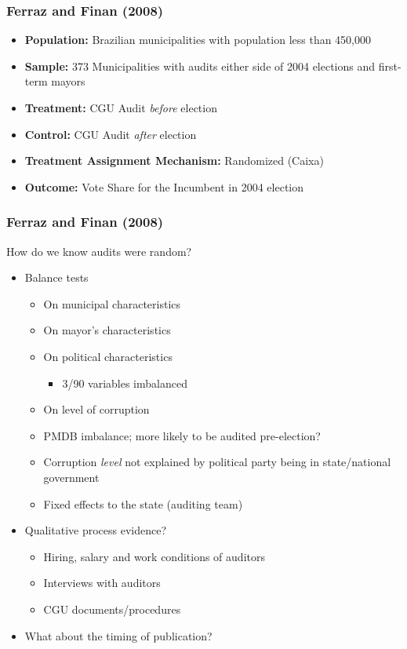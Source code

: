 \documentclass[xcolor=x11names,compress]{beamer}\usepackage[]{graphicx}\usepackage[]{color}
\renewcommand{\(}{\begin{columns}}
\renewcommand{\)}{\end{columns}}
\newcommand{\<}[1]{\begin{column}{#1}}
\renewcommand{\>}{\end{column}}
\begin{document}
\begin{frame}
\frametitle{Ferraz and Finan (2008)}
\begin{itemize}
\item \textbf{Population:} Brazilian municipalities with population less than 450,000
\pause
\item \textbf{Sample:} 373 Municipalities with audits either side of 2004 elections and first-term mayors
\pause
\item \textbf{Treatment:} CGU Audit \textit{before} election
\pause
\item \textbf{Control:} CGU Audit \textit{after} election
\pause
\item \textbf{Treatment Assignment Mechanism:} Randomized (Caixa)
\pause
\item \textbf{Outcome:} Vote Share for the Incumbent in 2004 election
\end{itemize}
\end{frame}

\begin{frame}
\frametitle{Ferraz and Finan (2008)}
How do we know audits were random?
\pause
\begin{itemize}
\item Balance tests
\begin{itemize}
\item On municipal characteristics
\item On mayor's characteristics
\item On political characteristics
\begin{itemize}
\item 3/90 variables imbalanced
\end{itemize}
\item On level of corruption
\pause
\item PMDB imbalance; more likely to be audited pre-election?
\pause
\item Corruption \textit{level} not explained by political party being in state/national government
\pause
\item Fixed effects to the state (auditing team)
\end{itemize}
\pause
\item Qualitative process evidence?
\pause
\begin{itemize}
\item Hiring, salary and work conditions of auditors
\pause
\item Interviews with auditors
\pause
\item CGU documents/procedures
\pause
\end{itemize}
\item What about the timing of publication?
\end{itemize}
\end{frame}
\end{document}
